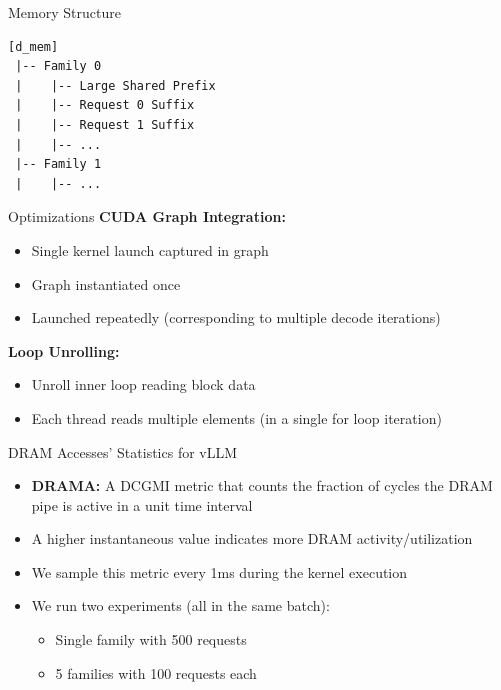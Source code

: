 \documentclass[Serif, 10pt, brown]{beamer}
\theoremstyle{example}
\theoremstyle{plain}
\begin{document}
\begin{frame}[fragile]{Memory Structure}
\begin{verbatim}
[d_mem]
 |-- Family 0
 |    |-- Large Shared Prefix
 |    |-- Request 0 Suffix
 |    |-- Request 1 Suffix
 |    |-- ...
 |-- Family 1
 |    |-- ...

\end{verbatim}

\end{frame}


\begin{frame}{Optimizations}
    \textbf{CUDA Graph Integration:}
\begin{itemize}
    \item Single kernel launch captured in graph
    \item Graph instantiated once
    \item Launched repeatedly (corresponding to multiple decode iterations)
\end{itemize}

\textbf{Loop Unrolling:}
\begin{itemize}
    \item Unroll inner loop reading block data
    \item Each thread reads multiple elements (in a single for loop iteration)
\end{itemize}
\end{frame}


\begin{frame}{DRAM Accesses' Statistics for vLLM}
    \begin{itemize}
        \item \textbf{DRAMA:} A DCGMI metric that counts the fraction of cycles the DRAM pipe is active in a unit time interval
        \item A higher instantaneous value indicates more DRAM activity/utilization
        \item We sample this metric every 1ms during the kernel execution
        \item We run two experiments (all in the same batch):
        \begin{itemize}
            \item Single family with 500 requests
            \item 5 families with 100 requests each
        \end{itemize}
    \end{itemize}
\end{frame}
\end{document}
